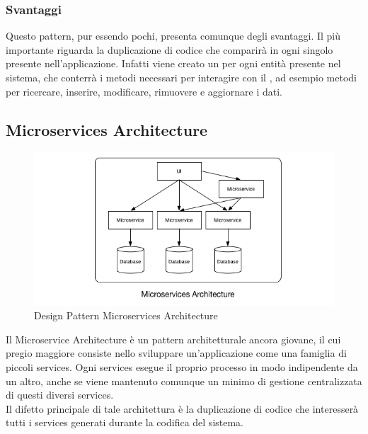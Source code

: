 \documentclass[a4paper, titlepage]{article}
\begin{document}
\subsubsection{Svantaggi}
Questo pattern, pur essendo pochi, presenta comunque degli svantaggi. Il più importante riguarda la duplicazione di codice che comparirà in ogni singolo  presente nell'applicazione. Infatti viene creato un  per ogni entità presente nel sistema, che conterrà i metodi necessari per interagire con il , ad esempio metodi per ricercare, inserire, modificare, rimuovere e aggiornare i dati.

\subsection{Microservices Architecture}
\begin{figure}[htp]
\centering
\includegraphics[scale=0.75]{Img/microservice.png}
\caption{Design Pattern Microservices Architecture}
\label{}
\end{figure}
Il Microservice Architecture è un pattern architetturale ancora giovane, il cui pregio maggiore consiste nello sviluppare un'applicazione come una famiglia di piccoli services. Ogni services esegue il proprio processo in modo indipendente da un altro, anche se viene mantenuto comunque un minimo di gestione centralizzata di questi diversi services.
\\ Il difetto principale di tale architettura è la duplicazione di codice che interesserà tutti i services generati durante la codifica del sistema.
\end{document}
